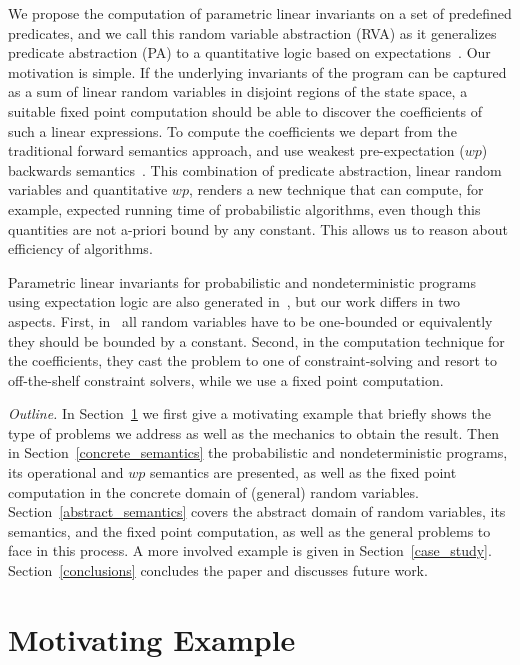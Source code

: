 \documentclass{eptcs}
\theoremstyle{plain}
\theoremstyle{definition}
\newcommand{\lit}[1]{\ensuremath{\mathit{#1}}}
\newcommand{\Wp}{\lit{wp}}
\begin{document}
We propose the computation of parametric linear invariants on a set of predefined predicates, and we call this random variable abstraction (RVA) as it generalizes predicate abstraction (PA) to a quantitative logic based on expectations~\cite{morgan04arp}.
Our motivation is simple.
If the underlying invariants of the program can be captured as a sum of linear random variables in disjoint regions of the state space, a suitable fixed point computation should be able to discover the coefficients of such a linear expressions.
To compute the coefficients we depart from the traditional forward semantics approach, and use weakest \mbox{pre-expectation} ($\Wp$) backwards semantics~\cite{morgan04arp}.
This combination of predicate abstraction, linear random variables and quantitative $\Wp$, renders a new technique that can compute, for example, expected running time of probabilistic algorithms, even though this quantities are not a-priori bound by any constant.
This allows us to reason about efficiency of algorithms.

Parametric linear invariants for probabilistic and nondeterministic programs using expectation logic are also generated in~\cite{katoen09linear}, but our work differs in two aspects.
First, in~\cite{katoen09linear} all random variables have to be one-bounded or equivalently they should be bounded by a constant.
Second, in the computation technique for the coefficients, they cast the problem to one of constraint-solving and resort to off-the-shelf constraint solvers, while we use a fixed point computation.

\smallskip

\textit{Outline.} In Section~\ref{motivation} we first give a motivating example that briefly shows the type of problems we address as well as the mechanics to obtain the result.
Then in Section~\ref{concrete_semantics} the probabilistic and nondeterministic programs, its operational and $\Wp$ semantics are presented, as well as the fixed point computation in the concrete domain of (general) random variables.
Section~\ref{abstract_semantics} covers the abstract domain of random variables, its semantics, and the fixed point computation, as well as the general problems to face in this process.
A more involved example is given in Section~\ref{case_study}.
Section~\ref{conclusions} concludes the paper and discusses future work.


\section{Motivating Example}\label{motivation}
\end{document}
